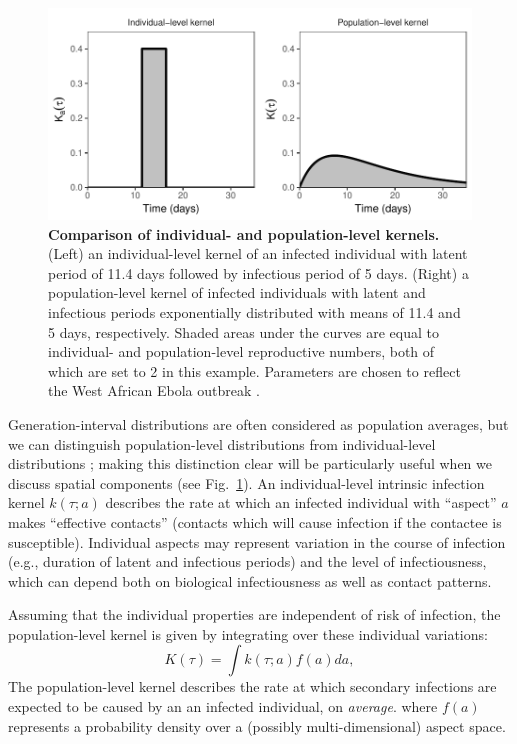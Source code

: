 \documentclass[12pt]{article}
\newcommand{\fref}[1]{Fig.~\ref{fig:#1}}
\begin{document}
\begin{figure}[!pbth]
\includegraphics[width=\textwidth]{../fig/individual_and_population.pdf}
\caption{\textbf{Comparison of individual- and population-level kernels.}
(Left) an individual-level kernel of an infected individual with latent period of 11.4 days followed by infectious period of 5 days. 
(Right) a population-level kernel of infected individuals with latent and infectious periods exponentially distributed with means of 11.4 and 5 days, respectively. 
Shaded areas under the curves are equal to individual- and population-level reproductive numbers, both of which are set to 2 in this example.
Parameters are chosen to reflect the West African Ebola outbreak \citep{who2014ebola}.}
\label{fig:indpop}
\end{figure}

Generation-interval distributions are often considered as population averages, but we can distinguish population-level distributions from individual-level distributions \citep{svensson2007note, svensson2015influence}; 
making this distinction clear will be particularly useful when we discuss spatial components (see \fref{indpop}).
An individual-level intrinsic infection kernel $k(\tau; a)$ describes the rate at which an infected individual with ``aspect'' $a$ makes ``effective contacts'' (contacts which will cause infection if the contactee is susceptible).
Individual aspects may represent variation in the course of infection (e.g., duration of latent and infectious periods) and the level of infectiousness, which can depend both on biological infectiousness as well as contact patterns.

Assuming that the individual properties are independent of risk of infection, the population-level kernel is given by integrating over these individual variations:
\begin{equation}
K(\tau) = \int k (\tau; a) f(a) da,
\end{equation}
The population-level kernel describes the rate at which secondary infections are expected to be caused by an an infected individual, on \emph{average}.
where $f(a)$ represents a probability density over a (possibly multi-dimensional) aspect space.
\end{document}
